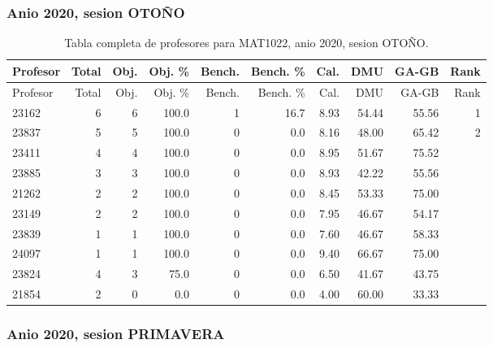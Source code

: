 \subsubsection{Anio 2020, sesion OTOÑO}

\begingroup
\scriptsize
\setlength{\tabcolsep}{3pt}
\begin{longtable}{lrrrrrrrrr}
\caption{Tabla completa de profesores para MAT1022, anio 2020, sesion OTOÑO.}\label{tab:prof-period-mat1022-2020-oto-o}\\
\toprule
Profesor & Total & Obj. & Obj. \% & Bench. & Bench. \% & Cal. & DMU & GA-GB & Rank \\
\midrule
\endfirsthead
\toprule
Profesor & Total & Obj. & Obj. \% & Bench. & Bench. \% & Cal. & DMU & GA-GB & Rank \\
\midrule
\endhead
23162 & 6 & 6 & 100.0 & 1 & 16.7 & 8.93 & 54.44 & 55.56 & 1 \\
23837 & 5 & 5 & 100.0 & 0 & 0.0 & 8.16 & 48.00 & 65.42 & 2 \\
23411 & 4 & 4 & 100.0 & 0 & 0.0 & 8.95 & 51.67 & 75.52 &  \\
23885 & 3 & 3 & 100.0 & 0 & 0.0 & 8.93 & 42.22 & 55.56 &  \\
21262 & 2 & 2 & 100.0 & 0 & 0.0 & 8.45 & 53.33 & 75.00 &  \\
23149 & 2 & 2 & 100.0 & 0 & 0.0 & 7.95 & 46.67 & 54.17 &  \\
23839 & 1 & 1 & 100.0 & 0 & 0.0 & 7.60 & 46.67 & 58.33 &  \\
24097 & 1 & 1 & 100.0 & 0 & 0.0 & 9.40 & 66.67 & 75.00 &  \\
23824 & 4 & 3 & 75.0 & 0 & 0.0 & 6.50 & 41.67 & 43.75 &  \\
21854 & 2 & 0 & 0.0 & 0 & 0.0 & 4.00 & 60.00 & 33.33 &  \\
\bottomrule
\end{longtable}
\endgroup

\subsubsection{Anio 2020, sesion PRIMAVERA}

